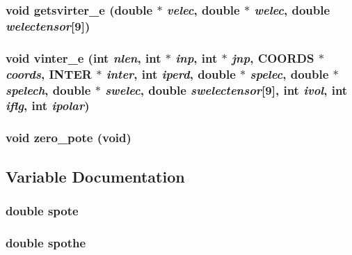 \subsubsection{\setlength{\rightskip}{0pt plus 5cm}void getsvirter\_\-e (double $\ast$ {\em velec}, double $\ast$ {\em welec}, double {\em welectensor}[9])}\label{finter__e_8c_9208d6046cf9dc1722cf0d801b9da208}


\subsubsection{\setlength{\rightskip}{0pt plus 5cm}void vinter\_\-e (int {\em nlen}, int $\ast$ {\em inp}, int $\ast$ {\em jnp}, {\bf COORDS} $\ast$ {\em coords}, {\bf INTER} $\ast$ {\em inter}, int {\em iperd}, double $\ast$ {\em spelec}, double $\ast$ {\em spelech}, double $\ast$ {\em swelec}, double {\em swelectensor}[9], int {\em ivol}, int {\em iflg}, int {\em ipolar})}\label{finter__e_8c_542d6b8e226c2b52c3131754eeb5e5a6}


\subsubsection{\setlength{\rightskip}{0pt plus 5cm}void zero\_\-pote (void)}\label{finter__e_8c_d8204917082dd0a8cf30e570067a6318}




\subsection{Variable Documentation}
\subsubsection{\setlength{\rightskip}{0pt plus 5cm}double {\bf spote}\hspace{0.3cm}{\tt  [static]}}\label{finter__e_8c_46174b721cc7fc50f34a75884e4bba99}


\subsubsection{\setlength{\rightskip}{0pt plus 5cm}double {\bf spothe}\hspace{0.3cm}{\tt  [static]}}\label{finter__e_8c_840805f3d6756ac1e574fbeabe80444c}


